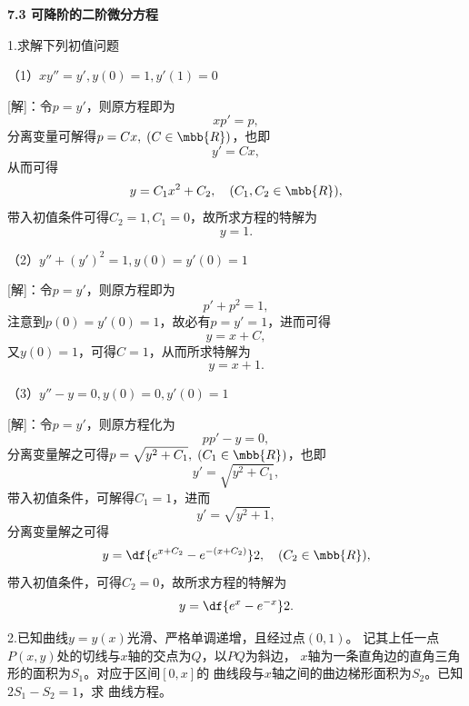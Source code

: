 \bs

\begin{center}
	\bf 7.3 可降阶的二阶微分方程
\end{center}

1.求解下列初值问题

（1）$xy''=y',y(0)=1,y'(1)=0$

[解]：令$p=y'$，则原方程即为
$$xp'=p,$$
分离变量可解得$p=Cx,\;(C\in\mbb{R})$，也即
$$y'=Cx,$$
从而可得
$$y=C_1x^2+C_2,\quad (C_1,C_2\in\mbb{R}),$$
带入初值条件可得$C_2=1,C_1=0$，故所求方程的特解为
$$y=1.$$

\bs

（2）$y''+(y')^2=1,y(0)=y'(0)=1$

[解]：令$p=y'$，则原方程即为
$$p'+p^2=1,$$
注意到$p(0)=y'(0)=1$，故必有$p=y'=1$，进而可得
$$y=x+C,$$
又$y(0)=1$，可得$C=1$，从而所求特解为
$$y=x+1.$$

\bs

（3）$y''-y=0,y(0)=0,y'(0)=1$

[解]：令$p=y'$，则原方程化为
$$pp'-y=0,$$
分离变量解之可得$p=\sqrt{y^2+C_1},\;(C_1\in\mbb{R})$，也即
$$y'=\sqrt{y^2+C_1},$$
带入初值条件，可解得$C_1=1$，进而
$$y'=\sqrt{y^2+1},$$
分离变量解之可得
$$y=\df{e^{x+C_2}-e^{-(x+C_2)}}2,\quad (C_2\in\mbb{R}),$$
带入初值条件，可得$C_2=0$，故所求方程的特解为
$$y=\df{e^x-e^{-x}}2.$$
\fin

\bs

2.已知曲线$y=y(x)$光滑、严格单调递增，且经过点$(0,1)$。
记其上任一点$P(x,y)$处的切线与$x$轴的交点为$Q$，以$PQ$为斜边，
$x$轴为一条直角边的直角三角形的面积为$S_1$。对应于区间$[0,x]$的
曲线段与$x$轴之间的曲边梯形面积为$S_2$。已知$2S_1-S_2=1$，求
曲线方程。

